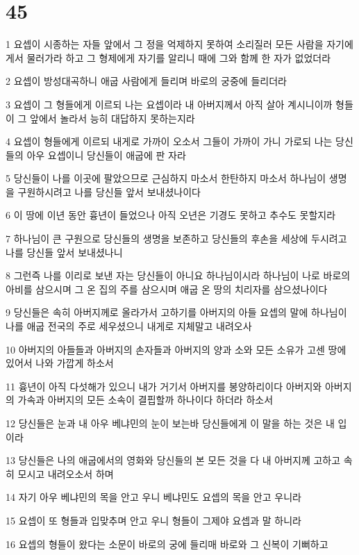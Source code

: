 \chapter{45}

\par 1 요셉이 시종하는 자들 앞에서 그 정을 억제하지 못하여 소리질러 모든 사람을 자기에게서 물러가라 하고 그 형제에게 자기를 알리니 때에 그와 함께 한 자가 없었더라
\par 2 요셉이 방성대곡하니 애굽 사람에게 들리며 바로의 궁중에 들리더라
\par 3 요셉이 그 형들에게 이르되 나는 요셉이라 내 아버지께서 아직 살아 계시니이까 형들이 그 앞에서 놀라서 능히 대답하지 못하는지라
\par 4 요셉이 형들에게 이르되 내게로 가까이 오소서 그들이 가까이 가니 가로되 나는 당신들의 아우 요셉이니 당신들이 애굽에 판 자라
\par 5 당신들이 나를 이곳에 팔았으므로 근심하지 마소서 한탄하지 마소서 하나님이 생명을 구원하시려고 나를 당신들 앞서 보내셨나이다
\par 6 이 땅에 이년 동안 흉년이 들었으나 아직 오년은 기경도 못하고 추수도 못할지라
\par 7 하나님이 큰 구원으로 당신들의 생명을 보존하고 당신들의 후손을 세상에 두시려고 나를 당신들 앞서 보내셨나니
\par 8 그런즉 나를 이리로 보낸 자는 당신들이 아니요 하나님이시라 하나님이 나로 바로의 아비를 삼으시며 그 온 집의 주를 삼으시며 애굽 온 땅의 치리자를 삼으셨나이다
\par 9 당신들은 속히 아버지께로 올라가서 고하기를 아버지의 아들 요셉의 말에 하나님이 나를 애굽 전국의 주로 세우셨으니 내게로 지체말고 내려오사
\par 10 아버지의 아들들과 아버지의 손자들과 아버지의 양과 소와 모든 소유가 고센 땅에 있어서 나와 가깝게 하소서
\par 11 흉년이 아직 다섯해가 있으니 내가 거기서 아버지를 봉양하리이다 아버지와 아버지의 가속과 아버지의 모든 소속이 결핍할까 하나이다 하더라 하소서
\par 12 당신들은 눈과 내 아우 베냐민의 눈이 보는바 당신들에게 이 말을 하는 것은 내 입이라
\par 13 당신들은 나의 애굽에서의 영화와 당신들의 본 모든 것을 다 내 아버지께 고하고 속히 모시고 내려오소서 하며
\par 14 자기 아우 베냐민의 목을 안고 우니 베냐민도 요셉의 목을 안고 우니라
\par 15 요셉이 또 형들과 입맞추며 안고 우니 형들이 그제야 요셉과 말 하니라
\par 16 요셉의 형들이 왔다는 소문이 바로의 궁에 들리매 바로와 그 신복이 기뻐하고
